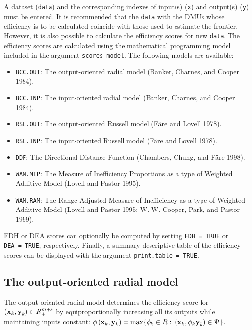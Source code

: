 A dataset (\texttt{data}) and the corresponding indexes of input(s) (\texttt{x}) and output(s) (\texttt{y}) must be entered. It is recommended that the \texttt{data} with the DMUs whose efficiency is to be calculated coincide with those used to estimate the frontier. However, it is also possible to calculate the efficiency scores for new \texttt{data}. The efficiency scores are calculated using the mathematical programming model included in the argument \texttt{scores\_model}. The following models are available:

\begin{itemize}
\item
  \texttt{BCC.OUT}: The output-oriented radial model (Banker, Charnes, and Cooper 1984).
\item
  \texttt{BCC.INP}: The input-oriented radial model (Banker, Charnes, and Cooper 1984).
\item
  \texttt{RSL.OUT}: The output-oriented Russell model (Färe and Lovell 1978).
\item
  \texttt{RSL.INP}: The input-oriented Russell model (Färe and Lovell 1978).
\item
  \texttt{DDF}: The Directional Distance Function (Chambers, Chung, and Färe 1998).
\item
  \texttt{WAM.MIP}: The Measure of Inefficiency Proportions as a type of Weighted Additive Model (Lovell and Pastor 1995).
\item
  \texttt{WAM.RAM}: The Range-Adjusted Measure of Inefficiency as a type of Weighted Additive Model (Lovell and Pastor 1995; W. W. Cooper, Park, and Pastor 1999).
\end{itemize}

FDH or DEA scores can optionally be computed by setting \texttt{FDH\ =\ TRUE} or \texttt{DEA\ =\ TRUE}, respectively. Finally, a summary descriptive table of the efficiency scores can be displayed with the argument \texttt{print.table\ =\ TRUE}.

\hypertarget{the-output-oriented-radial-model}{%
\subsection{The output-oriented radial model}\label{the-output-oriented-radial-model}}

The output-oriented radial model determines the efficiency score for \(\left({\it \textbf{x}}_{k} ,{\it \textbf{y}}_{k} \right)\in R_{+}^{m+s}\) by equiproportionally increasing all its outputs while maintaining inputs constant: \(\phi \left({\it \textbf{x}}_{k}, {\it \textbf{y}}_{k} \right)=\max \{\phi _{k} \in R:\) \(\left({\it \textbf{x}}_{k} ,\phi_{k} {\it \textbf{y}}_{k} \right)\in \Psi \}\).

